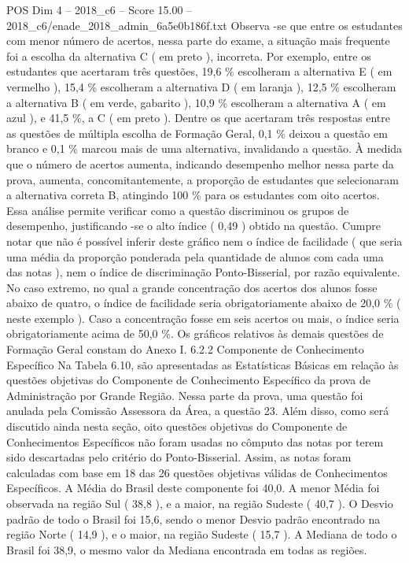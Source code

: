\begin{textsample}{POS Dim 4 – 2018\_c6 – Score 15.00 – 2018\_c6/enade\_2018\_admin\_6a5e0b186f.txt}
Observa -se que entre os estudantes com menor número de acertos, nessa parte do exame, a situação mais frequente foi a escolha da alternativa C ( em preto ), incorreta.
Por exemplo, entre os estudantes que acertaram três questões, 19,6 \% escolheram a alternativa E ( em vermelho ), 15,4 \% escolheram a alternativa D ( em laranja ), 12,5 \% escolheram a alternativa B ( em verde, gabarito ), 10,9 \% escolheram a alternativa A ( em azul ), e 41,5 \%, a C ( em preto ).
Dentre os que acertaram três respostas entre as questões de múltipla escolha de Formação Geral, 0,1 \% deixou a questão em branco e 0,1 \% marcou mais de uma alternativa, invalidando a questão.
À medida que o número de acertos aumenta, indicando desempenho melhor nessa parte da prova, aumenta, concomitantemente, a proporção de estudantes que selecionaram a alternativa correta B, atingindo 100 \% para os estudantes com oito acertos.
Essa análise permite verificar como a questão discriminou os grupos de desempenho, justificando -se o alto índice ( 0,49 ) obtido na questão.
Cumpre notar que não é possível inferir deste gráfico nem o índice de facilidade ( que seria uma média da proporção ponderada pela quantidade de alunos com cada uma das notas ), nem o índice de discriminação Ponto-Bisserial, por razão equivalente.
No caso extremo, no qual a grande concentração dos acertos dos alunos fosse abaixo de quatro, o índice de facilidade seria obrigatoriamente abaixo de 20,0 \% ( neste exemplo ).
Caso a concentração fosse em seis acertos ou mais, o índice seria obrigatoriamente acima de 50,0 \%.
Os gráficos relativos às demais questões de Formação Geral constam do Anexo I. 6.2.2 Componente de Conhecimento Específico Na Tabela 6.10, são apresentadas as Estatísticas Básicas em relação às questões objetivas do Componente de Conhecimento Específico da prova de Administração por Grande Região.
Nessa parte da prova, uma questão foi anulada pela Comissão Assessora da Área, a questão 23.
Além disso, como será discutido ainda nesta seção, oito questões objetivas do Componente de Conhecimentos Específicos não foram usadas no cômputo das notas por terem sido descartadas pelo critério do Ponto-Bisserial.
Assim, as notas foram calculadas com base em 18 das 26 questões objetivas válidas de Conhecimentos Específicos.
A Média do Brasil deste componente foi 40,0.
A menor Média foi observada na região Sul ( 38,8 ), e a maior, na região Sudeste ( 40,7 ).
O Desvio padrão de todo o Brasil foi 15,6, sendo o menor Desvio padrão encontrado na região Norte ( 14,9 ), e o maior, na região Sudeste ( 15,7 ).
A Mediana de todo o Brasil foi 38,9, o mesmo valor da Mediana encontrada em todas as regiões.

\end{textsample}
